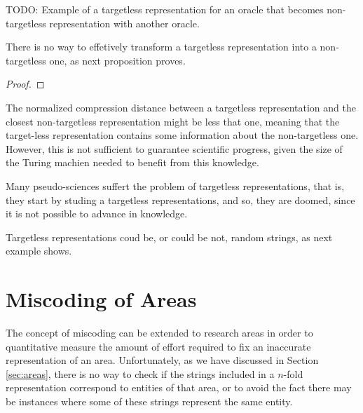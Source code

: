 \begin{example}
{\color{red} TODO: Example of a targetless representation for an oracle that becomes non-targetless representation with another oracle.}
\end{example}

There is no way to effetively transform a targetless representation into a non-targetless one, as next proposition proves.

\begin{proposition}
\end{proposition}
\begin{proof}
\end{proof}

The normalized compression distance between a targetless representation and the closest non-targetless representation might be less that one, meaning that the target-less representation contains some information about the non-targetless one. However, this is not sufficient to guarantee scientific progress, given the size of the Turing machien needed to benefit from this knowledge.

Many pseudo-sciences suffert the problem of targetless representations, that is, they start by studing a targetless representations, and so, they are doomed, since it is not possible to advance in knowledge.

\begin{example}
\end{example}

Targetless representations coud be, or could be not, random strings, as next example shows.

\begin{example}
\end{example}

%
%
\section{Miscoding of Areas}
\label{sec:miscoding_areas}

The concept of miscoding can be extended to research areas in order to quantitative measure the amount of effort required to fix an inaccurate representation of an area. Unfortunately, as we have discussed in Section \ref{sec:areas}, there is no way to check if the strings included in a $n$-fold representation correspond to entities of that area, or to avoid the fact there may be instances where some of these strings represent the same entity.

